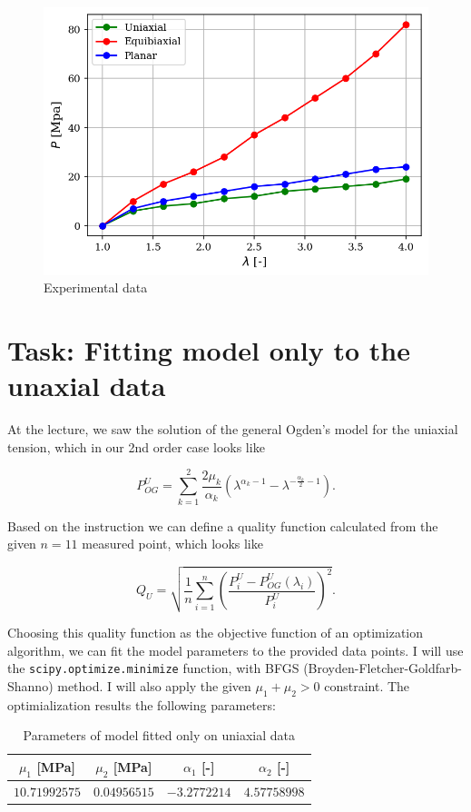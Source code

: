 \documentclass[12pt,a4paper]{article}
\begin{document}
\begin{figure}[h]
    \centering
    \includegraphics[scale=1]{figures/experiments.png}
    \caption{Experimental data}
\end{figure}


\section{Task: Fitting model only to the unaxial data}

At the lecture, we saw the solution of the general Ogden's model for the uniaxial tension, which in our 2nd order case looks like

$$
P^U_{OG} = \sum_{k=1}^2 \frac{2\mu_k}{\alpha_k}(\lambda^{\alpha_k - 1} - \lambda^{-\frac{\alpha_k}{2} - 1}).
$$

Based on the instruction we can define a quality function calculated from the given $n=11$ measured point, which looks like

$$
Q_U = \sqrt{\frac{1}{n}\sum_{i=1}^{n} \left(\frac{P^U_i-P^U_{OG}(\lambda_i)}{P^U_i}\right)^2}.
$$

Choosing this quality function as the objective function of an optimization algorithm, we can fit the model parameters to the provided data points. I will use the \texttt{scipy.optimize.minimize} function, with BFGS (Broyden-Fletcher-Goldfarb-Shanno) method. I will also apply the given $\mu_1 + \mu_2 > 0$ constraint. The optimialization results the following parameters:


\begin{table}[h]
    \caption{Parameters of model fitted only on uniaxial data}
    \centering
    \begin{tabular}{|c|c|c|c|}
    \hline
    $\mu_1$ [MPa]& $\mu_2$ [MPa]& $\alpha_1$ [-]& $\alpha_2$ [-]\\ \hline
    $10.71992575$   & $0.04956515$   & $-3.2772214$ & $4.57758998$   \\ \hline
    \end{tabular}
\end{table}
\end{document}
